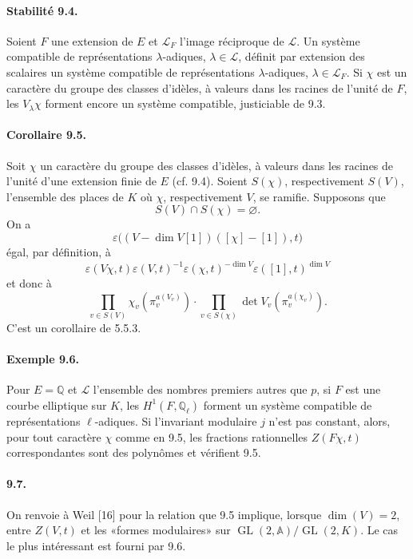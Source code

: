 \documentclass[10pt]{article}
\newcommand{\Q}{\mathbb Q}
\newcommand{\GL}{\operatorname{GL}}
\providecommand{\GL}{\operatorname{GL}}
\providecommand{\LLL}{\mathcal L}
\providecommand{\GL}{\operatorname{GL}}
\begin{document}
\paragraph{Stabilité 9.4.} Soient $F$ une extension de $E$ et $\LLL_F$ l'image réciproque de $\LLL$. Un système compatible de représentations $\lambda$-adiques, $\lambda\in\LLL$, définit par extension des scalaires un système compatible de représentations $\lambda$-adiques, $\lambda\in\LLL_F$. Si $\chi$ est un caractère du groupe des classes d'idèles, à valeurs dans les racines de l'unité de $F$, les $V_\lambda\chi$ forment encore un système compatible, justiciable de 9.3.

\paragraph{Corollaire 9.5.} Soit $\chi$ un caractère du groupe des classes d'idèles, à valeurs dans les racines de l'unité d'une extension finie de $E$ (cf. 9.4). Soient $S(\chi)$, respectivement $S(V)$, l'ensemble des places de $K$ où $\chi$, respectivement $V$, se ramifie. Supposons que
\[
S(V)\cap S(\chi)=\varnothing.
\]
On a
\[
\varepsilon\bigl((V-\dim V[1])([\chi]-[1]),t\bigr)
\]
égal, par définition, à
\[
\varepsilon(V\chi,t)\varepsilon(V,t)^{-1}
\varepsilon(\chi,t)^{-\dim V}\varepsilon([1],t)^{\dim V}
\]
et donc à
\[
\prod_{v\in S(V)}\chi_v(\pi_v^{a(V_v)})
\cdot
\prod_{v\in S(\chi)}\det V_v(\pi_v^{a(\chi_v)}).
\]
C'est un corollaire de 5.5.3.

\paragraph{Exemple 9.6.} Pour $E=\Q$ et $\LLL$ l'ensemble des nombres premiers autres que $p$, si $F$ est une courbe elliptique sur $K$, les $H^1(F,\Q_\ell)$ forment un système compatible de représentations $\ell$-adiques. Si l'invariant modulaire $j$ n'est pas constant, alors, pour tout caractère $\chi$ comme en 9.5, les fractions rationnelles $Z(F\chi,t)$ correspondantes sont des polynômes et vérifient 9.5.

\paragraph{9.7.} On renvoie à Weil [16] pour la relation que 9.5 implique, lorsque $\dim(V)=2$, entre $Z(V,t)$ et les «formes modulaires» sur $\GL(2,\mathbb A)/\GL(2,K)$. Le cas le plus intéressant est fourni par 9.6.
\end{document}
